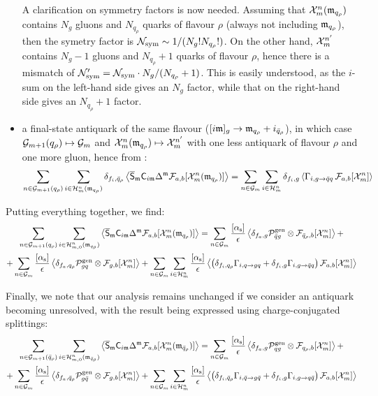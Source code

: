 \begin{itemize}
\begin{equation*}
  \end{equation*}
  A clarification on symmetry factors is now needed. Assuming that $ \mathcal{X}^{n}_{m}(\mathfrak{m}_{q_\rho}) $ contains $ N_g $ gluons and $ N_{q_\rho} $ quarks of flavour $ \rho $ (always not including $ \mathfrak{m}_{q_\rho} $), then the symetry factor is $ \mathcal{N}_\text{sym} \sim 1/(N_g! N_{q_\rho}!) $. On the other hand, $ \mathcal{X}^{n'}_{m} $ contains $ N_g - 1 $ gluons and $ N_{q_\rho} + 1 $ quarks of flavour $ \rho $, hence there is a mismatch of $ \mathcal{N}_\text{sym}' = \mathcal{N}_\text{sym} \cdot N_g / (N_{q_\rho} + 1) $. This is easily understood, as the $ i $-sum on the left-hand side gives an $ N_g $ factor, while that on the right-hand side gives an $ N_{q_\rho} + 1 $ factor.
  \item a final-state antiquark of the same flavour ($ [i\mathfrak{m}]_g \rightarrow \mathfrak{m}_{q_\rho} + i_{\bar{q}_\rho} $), in which case $ \mathcal{G}_{m+1}(q_\rho) \mapsto \mathcal{G}_m $ and $ \mathcal{X}^{n}_{m}(\mathfrak{m}_{q_\rho}) \mapsto \mathcal{X}^{n'}_{m} $ with one less antiquark of flavour $ \rho $ and one more gluon, hence from :
  \begin{equation*}
    \sum_{n \in \mathcal{G}_{m+1}(q_\rho)} \sum_{i \in \mathcal{H}^{n}_{m}(\mathfrak{m}_{q_\rho})} \delta_{f_i , \bar{q}_\rho} \left\langle \overline{\mathsf{S}}_{\mathfrak{m}} \mathsf{C}_{i\mathfrak{m}} \Delta^{\mathfrak{m}} \mathcal{F}_{a,b}[\mathcal{X}^{n}_{m}(\mathfrak{m}_{q_\rho})] \right\rangle = \sum_{n \in \mathcal{G}_m} \sum_{i \in \mathcal{H}^{n}_{m}} \delta_{f_i , g} \left\langle \Gamma_{i , g \rightarrow \bar{q} q} \,\mathcal{F}_{a,b}[\mathcal{X}^{n}_{m}] \right\rangle
  \end{equation*}
\end{itemize}
Putting everything together, we find:
\begin{multline}
  \sum_{n \in \mathcal{G}_{m+1}(q_\rho)} \sum_{i \in \mathcal{H}^{n}_{m,0}(\mathfrak{m}_{q_\rho})} \left\langle \overline{\mathsf{S}}_{\mathfrak{m}} \mathsf{C}_{i\mathfrak{m}} \Delta^{\mathfrak{m}} \mathcal{F}_{a,b}[\mathcal{X}^{n}_{m}(\mathfrak{m}_{q_\rho})] \right\rangle = \sum_{n \in \mathcal{G}_m} \frac{[\alpha_\text{s}]}{\epsilon} \left\langle \delta_{f_a , g} \mathcal{P}^\text{gen}_{\bar{q} g} \otimes \mathcal{F}_{\bar{q}_\rho , b}[\mathcal{X}^{n}_{m}] \right\rangle + \\
  + \sum_{n \in \mathcal{G}_m} \frac{[\alpha_\text{s}]}{\epsilon} \left\langle \delta_{f_a , q_\rho} \mathcal{P}^\text{gen}_{gq} \otimes \mathcal{F}_{g,b}[\mathcal{X}^{n}_{m}] \right\rangle + \sum_{n \in \mathcal{G}_m} \sum_{i \in \mathcal{H}^{n}_{m}} \frac{[\alpha_\text{s}]}{\epsilon} \left\langle \left( \delta_{f_i , q_\rho} \Gamma_{i , q \rightarrow g q} + \delta_{f_i , g} \Gamma_{i , g \rightarrow \bar{q} q} \right) \mathcal{F}_{a,b}[\mathcal{X}^{n}_{m}] \right\rangle
\end{multline}

Finally, we note that our analysis remains unchanged if we consider an antiquark becoming unresolved, with the result being expressed using charge-conjugated splittings:
\begin{multline}
  \sum_{n \in \mathcal{G}_{m+1}(\bar{q}_\rho)} \sum_{i \in \mathcal{H}^{n}_{m,0}(\mathfrak{m}_{\bar{q}_\rho})} \left\langle \overline{\mathsf{S}}_{\mathfrak{m}} \mathsf{C}_{i\mathfrak{m}} \Delta^{\mathfrak{m}} \mathcal{F}_{a,b}[\mathcal{X}^{n}_{m}(\mathfrak{m}_{\bar{q}_\rho})] \right\rangle = \sum_{n \in \mathcal{G}_m} \frac{[\alpha_\text{s}]}{\epsilon} \left\langle \delta_{f_a , g} \mathcal{P}^\text{gen}_{q g} \otimes \mathcal{F}_{q_\rho , b}[\mathcal{X}^{n}_{m}] \right\rangle + \\
  + \sum_{n \in \mathcal{G}_m} \frac{[\alpha_\text{s}]}{\epsilon} \left\langle \delta_{f_a , \bar{q}_\rho} \mathcal{P}^\text{gen}_{g \bar{q}} \otimes \mathcal{F}_{g,b}[\mathcal{X}^{n}_{m}] \right\rangle + \sum_{n \in \mathcal{G}_m} \sum_{i \in \mathcal{H}^{n}_{m}} \frac{[\alpha_\text{s}]}{\epsilon} \left\langle \left( \delta_{f_i , \bar{q}_\rho} \Gamma_{i , \bar{q} \rightarrow g \bar{q}} + \delta_{f_i , g} \Gamma_{i , g \rightarrow q \bar{q}} \right) \mathcal{F}_{a,b}[\mathcal{X}^{n}_{m}] \right\rangle
\end{multline}

